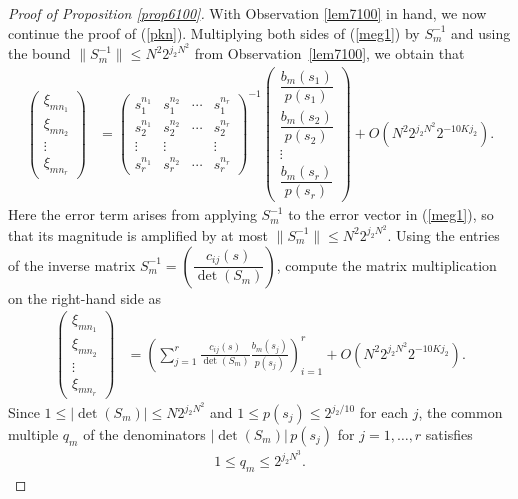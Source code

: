 \documentclass[11 pt,letterpaper]{amsart}
\theoremstyle{plain}
\theoremstyle{definition}
\theoremstyle{remark} \theoremstyle{exam} \theoremstyle{ob}
\numberwithin{equation}{section}
\begin{document}
\begin{proof}[Proof of Proposition \ref{prop6100}]
With Observation \ref{lem7100} in hand,
we now continue the proof of (\ref{pkn}).
Multiplying both sides of (\ref{meg1}) by $S_m^{-1}$ and using the bound 
$\|S_m^{-1}\| \le N^2 2^{j_2 N^2}$ from Observation~\ref{lem7100}, we obtain  that
\begin{align*} 
\begin{pmatrix}
\xi_{mn_1}\\
\xi_{mn_2}\\
\vdots\\
\xi_{mn_r}
\end{pmatrix}
&=
\begin{pmatrix}
s_1^{n_1} & s_1^{n_2} & \cdots & s_1^{n_r} \\
s_2^{n_1} & s_2^{n_2} & \cdots & s_2^{n_r} \\
\vdots & \vdots & & \vdots \\
s_r^{n_1} & s_r^{n_2} & \cdots & s_r^{n_r}
\end{pmatrix}^{-1}
\begin{pmatrix}
\dfrac{b_m(s_1)}{p(s_1)}\\[4pt]
\dfrac{b_m(s_2)}{p(s_2)}\\[4pt]
\vdots\\
\dfrac{b_m(s_r)}{p(s_r)}
\end{pmatrix}
+ O\!\left(N^2 2^{j_2 N^2} 2^{-10Kj_2}\right).
\end{align*}
Here the error term arises from applying $S_m^{-1}$ to the error vector in (\ref{meg1}), 
so that its magnitude is amplified by at most $\|S_m^{-1}\| \le N^2 2^{j_2 N^2}$.
  Using the entries of the inverse matrix 
$S_m^{-1}=\left(\dfrac{c_{ij}(s)}{\det(S_m)}\right)$, 
  compute the matrix multiplication on the right-hand side as
\begin{align*}
\begin{pmatrix}
\xi_{mn_1}\\
\xi_{mn_2}\\
\vdots\\
\xi_{mn_r}
\end{pmatrix}
&=
\left(
  \sum_{j=1}^r 
  \frac{c_{ij}(s)}{\det(S_m)} 
  \frac{b_m(s_j)}{p(s_j)}
\right)_{i=1}^r
+ O\!\left(N^2 2^{j_2 N^2} 2^{-10Kj_2}\right).
\end{align*}
Since  
$1\le |\det(S_m)| \le N 2^{j_2 N^2}$ 
and 
$1 \le p(s_j) \le 2^{j_2/10}$ 
for each $j$, 
the common multiple $q_m$ of the denominators 
$|\det(S_m)|\,p(s_j)$ for $j=1,\dots,r$ 
satisfies
\begin{align}\label{gh11}
1\le 
q_m \le 2^{j_2 N^3}.
\end{align}

\end{proof}
\end{document}
